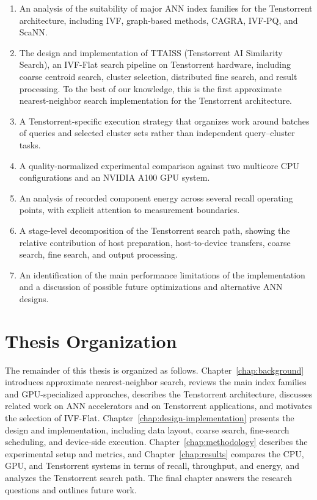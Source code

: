 \begin{enumerate}
\item An analysis of the suitability of major ANN index families for the Tenstorrent architecture, including IVF, graph-based methods, CAGRA, IVF-PQ, and ScaNN.

\item The design and implementation of TTAISS (Tenstorrent AI Similarity Search), an IVF-Flat search pipeline on Tenstorrent hardware, including coarse centroid search, cluster selection, distributed fine search, and result processing. To the best of our knowledge, this is the first approximate nearest-neighbor search implementation for the Tenstorrent architecture.

\item A Tenstorrent-specific execution strategy that organizes work around batches of queries and selected cluster sets rather than independent query--cluster tasks.

\item A quality-normalized experimental comparison against two multicore CPU configurations and an NVIDIA A100 GPU system.

\item An analysis of recorded component energy across several recall operating points, with explicit attention to measurement boundaries.

\item A stage-level decomposition of the Tenstorrent search path, showing the relative contribution of host preparation, host-to-device transfers, coarse search, fine search, and output processing.

\item An identification of the main performance limitations of the implementation and a discussion of possible future optimizations and alternative ANN designs.
\end{enumerate}

\section{Thesis Organization}

The remainder of this thesis is organized as follows. Chapter~\ref{chap:background} introduces approximate nearest-neighbor search, reviews the main index families and GPU-specialized approaches, describes the Tenstorrent architecture, discusses related work on ANN accelerators and on Tenstorrent applications, and motivates the selection of IVF-Flat. Chapter~\ref{chap:design-implementation} presents the design and implementation, including data layout, coarse search, fine-search scheduling, and device-side execution. Chapter~\ref{chap:methodology} describes the experimental setup and metrics, and Chapter~\ref{chap:results} compares the CPU, GPU, and Tenstorrent systems in terms of recall, throughput, and energy, and analyzes the Tenstorrent search path. The final chapter answers the research questions and outlines future work.

\cleardoublepage
